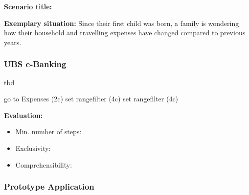 \textbf{Scenario title:} \scentwo

\textbf{Exemplary situation:} Since their first child was born, a family is wondering how their household and travelling expenses have changed compared to previous years.




\subsubsection{UBS e-Banking}

tbd

go to Expenses (2c)
set rangefilter (4c)
set rangefilter (4c)



\textbf{Evaluation:} 
\begin{itemize}[noitemsep,nolistsep]
	\item Min. number of steps: \textbf{}
	\item Exclusivity: \textbf{}
	\item Comprehensibility: \textbf{}
\end{itemize}



\subsubsection{Prototype Application}

